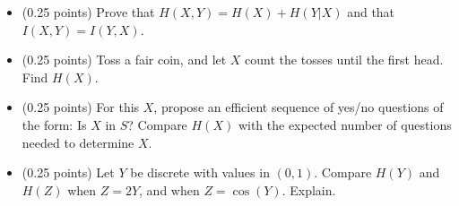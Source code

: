 \documentclass[a4paper]{report}
\begin{document}
\begin{problem}
\begin{itemize}
    \item (0.25 points) Prove that
    $H(X,Y)=H(X)+H(Y|X)$ and that
    $I(X,Y) = I(Y,X)$.

    \item (0.25 points) Toss a fair coin, and let \(X\) count the tosses until the first head. Find \(H(X)\).
    \item (0.25 points) For this \(X\), propose an efficient sequence of yes/no questions of the form: Is \(X\) in \(S\)? Compare \(H(X)\) with the expected number of questions needed to determine \(X\).
\item (0.25 points) Let \(Y\) be discrete with values in $(0,1)$. Compare $H(Y)$ and $H(Z)$ when \(Z=2Y\), and when $Z=\cos(Y)$. Explain.

\end{itemize}


\end{problem}
\end{document}
